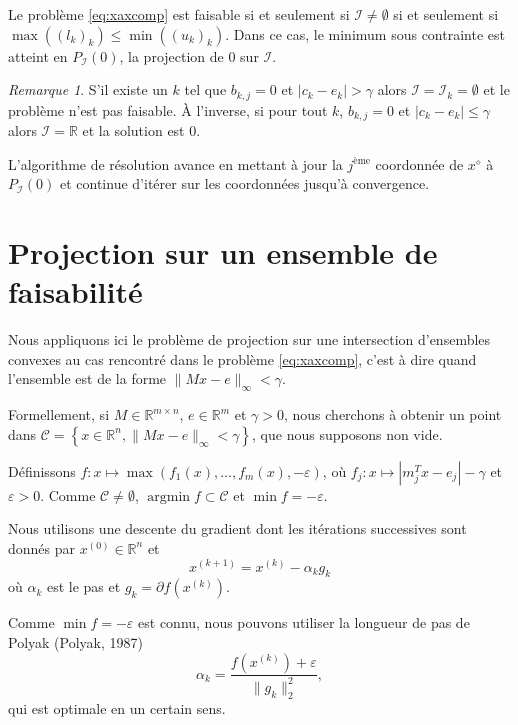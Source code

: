 \documentclass[12pt,a4paper]{reedthesis}
\newcommand \RR {\mathbb{R}}
\DeclareMathOperator*{\argmin}{argmin}
\theoremstyle{definition}
\theoremstyle{definition}
\theoremstyle{definition}
\theoremstyle{remark}
\newtheorem*{remark}{Remarque}
\begin{document}
Le problème \eqref{eq:xaxcomp} est faisable si et seulement si \(\mathcal{I} \neq \emptyset\) si et seulement si \(\max((l_k)_k) \leq \min((u_k)_k)\). Dans ce cas, le minimum sous contrainte est atteint en \(P_\mathcal{I}(0)\), la projection de \(0\) sur \(\mathcal{I}\).
\begin{remark}
{}S'il existe un \(k\) tel que \(b_{k,j} = 0\) et \(\left|c_k-e_k\right| > \gamma\) alors \(\mathcal{I} = \mathcal{I}_k = \emptyset\) et le problème n'est pas faisable. À l'inverse, si pour tout \(k\), \(b_{k,j} = 0\) et \(\left|c_k-e_k\right| \leq \gamma\) alors \(\mathcal{I} = \RR\) et la solution est \(0\).
\end{remark}
L'algorithme de résolution avance en mettant à jour la \(j^{\text{ème}}\) coordonnée de \(x^\diamond\) à \(P_\mathcal{I}(0)\) et continue d'itérer sur les coordonnées jusqu'à convergence.

\hypertarget{proj}{%
\section{Projection sur un ensemble de faisabilité}\label{proj}}

Nous appliquons ici le problème de projection sur une intersection d'ensembles convexes au cas rencontré dans le problème \eqref{eq:xaxcomp}, c'est à dire quand l'ensemble est de la forme \(\|Mx-e\|_{\infty} < \gamma\).

Formellement, si \(M \in \RR^{m\times n}\), \(e \in \RR^m\) et \(\gamma > 0\), nous cherchons à obtenir un point dans \(\mathcal{C} = \left\{x \in \RR^n, \|Mx-e\|_{\infty} < \gamma \right\}\), que nous supposons non vide.

Définissons \(f:x\mapsto \max\left(f_1(x), \ldots, f_m(x), -\varepsilon\right)\), où \(f_j: x\mapsto \left|m_j^Tx - e_j\right| - \gamma\) et \(\varepsilon > 0\). Comme \(\mathcal{C}\neq\emptyset\), \(\argmin f \subset \mathcal{C}\) et \(\min f = -\varepsilon\).

Nous utilisons une descente du gradient dont les itérations successives sont donnés par \(x^{(0)} \in \RR^n\) et
\begin{equation*}
x^{(k+1)} = x^{(k)} - \alpha_kg_k
\end{equation*}
où \(\alpha_k\) est le pas et \(g_k = \partial f\left(x^{(k)}\right)\).

Comme \(\min f = -\varepsilon\) est connu, nous pouvons utiliser la longueur de pas de Polyak (Polyak, 1987)
\begin{equation*}
\alpha_k = \frac{f\left(x^{(k)}\right) + \varepsilon}{\|g_k\|_2^2},
\end{equation*}
qui est optimale en un certain sens.
\end{document}
